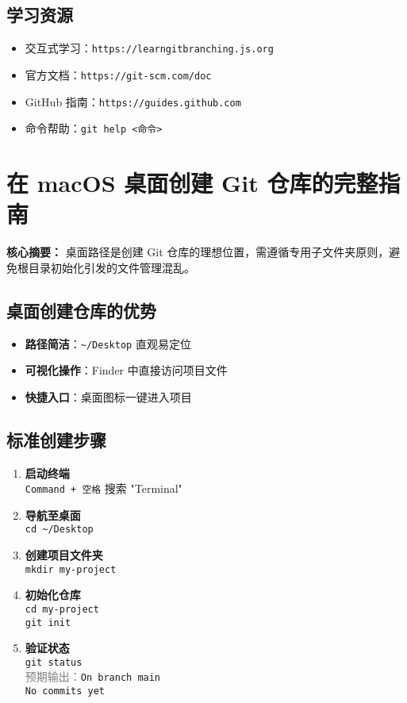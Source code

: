 \subsection{学习资源}
\begin{itemize}[leftmargin=*, nosep]
    \item 交互式学习：\texttt{https://learngitbranching.js.org}
    \item 官方文档：\texttt{https://git-scm.com/doc}
    \item GitHub 指南：\texttt{https://guides.github.com}
    \item 命令帮助：\texttt{git help <命令>}
\end{itemize}


\section{在 macOS 桌面创建 Git 仓库的完整指南}
\textbf{核心摘要：}  
桌面路径是创建 Git 仓库的理想位置，需遵循专用子文件夹原则，避免根目录初始化引发的文件管理混乱。

\subsection{桌面创建仓库的优势}
\begin{itemize}[leftmargin=*, nosep]
    \item \textbf{路径简洁}：\texttt{\textasciitilde/Desktop} 直观易定位
    \item \textbf{可视化操作}：Finder 中直接访问项目文件
    \item \textbf{快捷入口}：桌面图标一键进入项目
\end{itemize}

\subsection{标准创建步骤}
\begin{enumerate}[leftmargin=*, nosep]
    \item \textbf{启动终端} \\
    \texttt{Command + 空格} 搜索 "Terminal"
    
    \item \textbf{导航至桌面} \\
    \texttt{cd \textasciitilde/Desktop}
    
    \item \textbf{创建项目文件夹} \\
    \texttt{mkdir my-project}
    
    \item \textbf{初始化仓库} \\
    \texttt{cd my-project} \\ 
    \texttt{git init}
    
    \item \textbf{验证状态} \\
    \texttt{git status} \\
    \textcolor{gray}{预期输出：}\texttt{On branch main\\No commits yet}
\end{enumerate}

